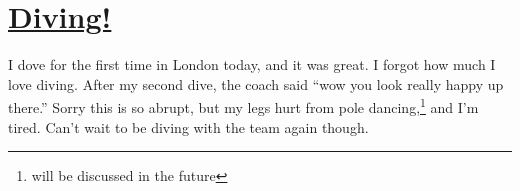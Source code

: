\documentclass[12pt]{article}[titlepage]
\newcommand{\say}[1]{``#1''}
\newcommand{\1}{\={a}}
\newcommand{\2}{\={e}}
\newcommand{\3}{\={\i}}
\newcommand{\4}{\=o}
\newcommand{\5}{\=u}
\newcommand{\6}{\={A}}
\renewcommand{\,}{\textsuperscript{,}}
\begin{document}
\doublespacing
\section{\href{diving.html}{Diving!}}
I dove for the first time in London today, and it was great.
I forgot how much I love diving.
After my second dive, the coach said \say{wow you look really happy up there.}
Sorry this is so abrupt, but my legs hurt from pole dancing,\footnote{will be discussed in the future} and I'm tired.
Can't wait to be diving with the team again though.
\end{document}
